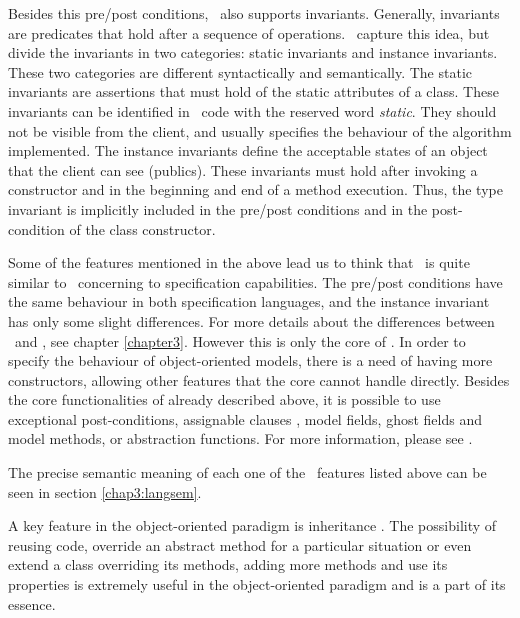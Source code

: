 Besides this pre/post conditions, \jml\ also supports invariants. Generally, invariants are predicates that hold after a sequence of 
operations. \jml\ capture this idea, but divide the invariants in two categories: static invariants and instance invariants.
These two categories are different syntactically and semantically. The static invariants are assertions that must hold of the 
static attributes of a class. These invariants can be identified in \jml\ code with the reserved word \textit{static}. They should not 
be visible from the client, and usually specifies the behaviour of the algorithm implemented.
The instance invariants define the acceptable states of an object that the client can see (publics). These invariants must hold 
after invoking a constructor and in the beginning and end of a method execution. Thus, the type invariant is implicitly included in the 
pre/post conditions and in the post-condition of the class constructor.

Some of the features mentioned in the above lead us to think that \jml\ is quite similar to \vpp\ concerning to specification 
capabilities. The pre/post conditions have the same behaviour in both specification languages, and the instance invariant has 
only some slight differences. For more details about the differences between \jml\ and \vpp, see chapter \ref{chapter3}.
However this is only the core of \jml. In order to specify the behaviour of object-oriented models, there is a need of having more 
constructors, allowing other features that the core cannot handle directly.
Besides the core functionalities of \jml already described above, it is possible to use exceptional post-conditions, assignable clauses \cite{cuiye06}, 
model fields, ghost fields and model methods, or abstraction functions. For more information, please see \cite{rustan-muller-leino06} \cite{cheon-etal03} \cite{leavens-etal07} \cite{rustan-muller-leino06}.

The precise semantic meaning of each one of the \jml\ features listed above can be seen in section \ref{chap3:langsem}.

A key feature in the object-oriented paradigm is inheritance \cite{devjavasoft}. The possibility of reusing code, 
override an abstract method for a particular situation or even extend a class overriding its methods, adding more methods and 
use its properties is extremely useful in the object-oriented paradigm and is a part of its essence.

